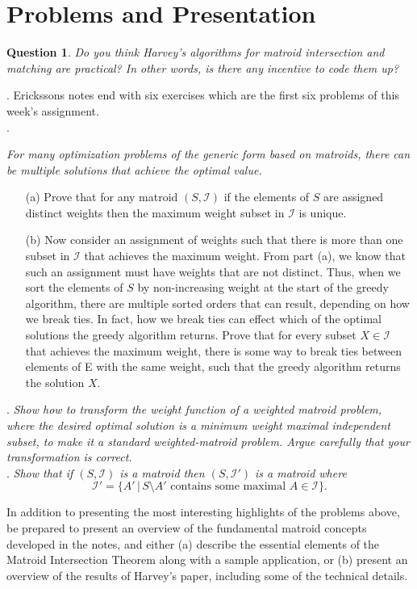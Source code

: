 \documentclass[11pt]{article}
\newtheorem{question}{Question}
\begin{document}
\section{Problems and Presentation}

\begin{question}
Do you think Harvey's algorithms for matroid intersection and matching are practical?  In other words, is there any incentive to code them up?
\end{question}

. Erickssons notes end with six exercises which are the first six problems of this week's assignment.\\

.  {\em For many optimization problems of the generic form based on matroids, there can be multiple solutions that achieve the optimal value.
	\begin{itemize} 
		\item [(a)]  Prove that for any matroid $(S, \mathcal{I})$ if the elements of $S$ are assigned distinct weights then the maximum weight subset in $\mathcal{I}$ is unique.
		\item [(b)]  Now consider an assignment of weights such that there is more than one subset in $\mathcal{I}$ that achieves the maximum weight. From part (a), we know that such an assignment must have weights that are not distinct. Thus, when we sort the elements of $S$ by non-increasing weight at the start of the greedy algorithm, there are multiple sorted orders that can result, depending on how we break ties. In fact, how we break ties can effect which of the optimal solutions the greedy algorithm returns.  Prove that for every subset $X \in \mathcal{I}$ that achieves the maximum weight, there is some way to break ties between elements of E with the same weight, such that the greedy algorithm returns the solution $X$.
	\end{itemize}}

.  {\em Show how to transform the weight function of a weighted matroid problem, where the desired optimal solution is a {\em minimum weight} maximal independent subset, to make it a standard weighted-matroid problem.  Argue carefully that your transformation is correct.}\\

.  {\em Show that if $(S, \mathcal{I})$ is a matroid then $(S, \mathcal{I}')$ is a matroid where
\[
\mathcal{I}' = \{A' \,|\, S \setminus A' \mbox{ contains some maximal $A \in \mathcal{I}$}\}.
\]
}

In addition to presenting the most interesting highlights of the problems above, be prepared to present an overview of the fundamental matroid concepts developed in the notes, and either (a) describe the essential elements of the Matroid Intersection Theorem along with a sample application, or (b) present an overview of the results of Harvey's paper, including some of the technical details.



\end{document}
